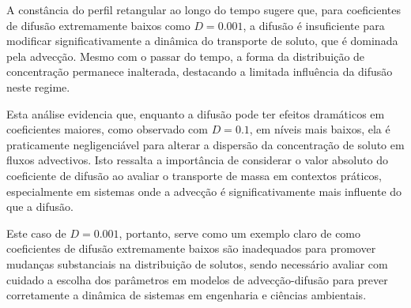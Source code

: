 A constância do perfil retangular ao longo do tempo sugere que, para coeficientes de difusão extremamente baixos como \( D = 0.001 \), a difusão é insuficiente para modificar significativamente a dinâmica do transporte de soluto, que é dominada pela advecção. Mesmo com o passar do tempo, a forma da distribuição de concentração permanece inalterada, destacando a limitada influência da difusão neste regime.

Esta análise evidencia que, enquanto a difusão pode ter efeitos dramáticos em coeficientes maiores, como observado com \( D = 0.1 \), em níveis mais baixos, ela é praticamente negligenciável para alterar a dispersão da concentração de soluto em fluxos advectivos. Isto ressalta a importância de considerar o valor absoluto do coeficiente de difusão ao avaliar o transporte de massa em contextos práticos, especialmente em sistemas onde a advecção é significativamente mais influente do que a difusão.

Este caso de \( D = 0.001 \), portanto, serve como um exemplo claro de como coeficientes de difusão extremamente baixos são inadequados para promover mudanças substanciais na distribuição de solutos, sendo necessário avaliar com cuidado a escolha dos parâmetros em modelos de advecção-difusão para prever corretamente a dinâmica de sistemas em engenharia e ciências ambientais.
